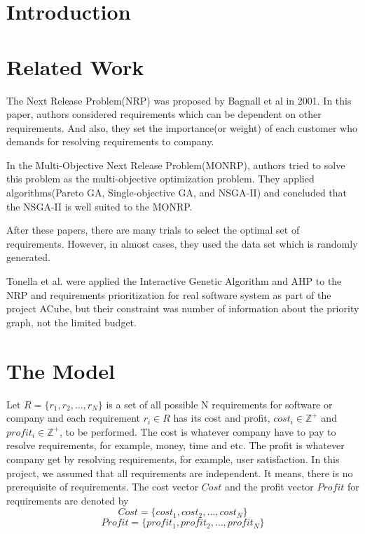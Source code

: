 \section{Introduction}


\section{Related Work}
The Next Release Problem(NRP)\cite{NRP} was proposed by Bagnall et al in 2001. In this paper, authors considered requirements which can be dependent on other requirements. And also, they set the importance(or weight) of each customer who demands for resolving requirements to company.

In the Multi-Objective Next Release Problem(MONRP)\cite{MONRP}, authors tried to solve this problem as the multi-objective optimization problem. They applied algorithms(Pareto GA, Single-objective GA, and NSGA-II) and concluded that the NSGA-II is well suited to the MONRP.

After these papers, there are many trials to select the optimal set of requirements.\cite{ILP} \cite{DE} \cite{ACO} However, in almost cases, they used the data set which is randomly generated.

Tonella et al. were applied the Interactive Genetic Algorithm and AHP to the NRP and requirements prioritization for real software system as part of the project ACube, but their constraint was number of information about the priority graph, not the limited budget.\cite{IGA} 



\section{The Model}

Let $R = \{r_1, r_2, \ldots, r_N\}$ is a set of all possible N requirements for software or company and each requirement $r_i \in R$ has its cost and profit, $cost_i \in \mathbb{Z}^+$ and $profit_i \in \mathbb{Z}^+$, to be performed. The cost is whatever company have to pay to resolve requirements, for example, money, time and etc. The profit is whatever company get by resolving requirements, for example, user satisfaction. In this project, we assumed that all requirements are independent. It means, there is no prerequisite of requirements. The cost vector $Cost$ and the profit vector $Profit$ for requirements are denoted by 
\[
Cost = \{cost_1, cost_2, \ldots, cost_N\}
\]
\[
Profit = \{profit_1, profit_2, \ldots, profit_N\}
\]

